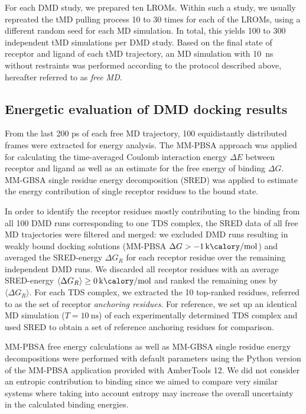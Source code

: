 For each DMD study, we prepared ten LROMs. Within such a study, we usually
repreated the tMD pulling process 10 to 30 times for each of the LROMs, using a
different random seed for each MD simulation. In total, this yields 100 to 300
independent tMD simulations per DMD study. Based on the final state of receptor
and ligand of each tMD trajectory, an MD simulation with \SI{10}{\nano\second}
without restraints was performed according to the protocol described above,
hereafter referred to as \textit{free MD}.


\subsection{Energetic evaluation of DMD docking results}

From the last 200 ps of each free MD trajectory, 100 equidistantly distributed
frames were extracted for energy analysis. The MM-PBSA \cite{mmpbsa_py} approach
was applied for calculating the time-averaged Coulomb interaction energy $\Delta
E$ between receptor and ligand as well as an estimate for the free energy of
binding $\Delta G$. MM-GBSA\cite{mmpbsa_py} single residue energy decomposition
(SRED) was applied to estimate the energy contribution of single receptor
residues to the bound state.

In order to identify the receptor residues mostly contributing to the binding
from all 100 DMD runs corresponding to one TDS complex, the SRED data of all
free MD trajectories were filtered and merged: we excluded DMD runs resulting in
weakly bound docking solutions (MM-PBSA $\Delta G >
\SI{-1}{\kilo\calory\per\mole} $) and averaged the SRED-energy $\Delta G_R$ for
each receptor residue over the remaining independent DMD runs. We discarded all
receptor residues with an average SRED-energy $\langle\Delta G_R\rangle \ge
\SI{0}{\kilo\calory\per\mole}$ and ranked the remaining ones by $\langle\Delta
G_R\rangle$. For each TDS complex, we extracted the 10 top-ranked residues,
referred to as the set of receptor \textit{anchoring residues}. For reference,
we set up an identical MD simulation ($T=\SI{10}{\nano\second}$) of each
experimentally determined TDS complex and used SRED to obtain a set of reference
anchoring residues for comparison.

MM-PBSA free energy calculations as well as MM-GBSA single residue energy
decompositions were performed with default parameters using the Python version
of the MM-PBSA application provided with AmberTools 12. We did not consider an
entropic contribution to binding since we aimed to compare very similar systems
where taking into account entropy may increase the overall uncertainty in the
calculated binding energies{\cite{Gandhi01102009, homeyer_gohlke_2012}}.

